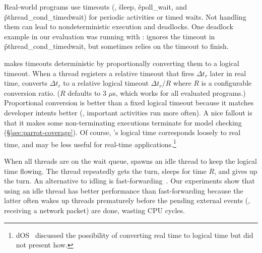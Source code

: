 Real-world programs use timeouts (\eg, \v{sleep},
\v{epoll\_wait}, and \v{pthread\_cond\_timedwait}) for periodic activities
or timed waits.  Not handling them can lead to nondeterministic execution and
deadlocks.  One deadlock example in our evaluation was running \pbzip with
\dthreads: \dthreads ignores the timeout in
\v{pthread\_cond\_timedwait}, but \pbzip sometimes relies on the timeout to finish.

\parrot makes timeouts deterministic by proportionally converting them to a
logical timeout.  When a thread registers a relative timeout that fires
$\Delta t_r$ later in real time, \parrot converts $\Delta t_r$ to a relative
logical timeout $\Delta t_r /R$ where $R$ is a configurable conversion
ratio. ($R$ defaults to 3 $\mu$s, which works for all evaluated programs.)
Proportional conversion is better than a fixed logical timeout because it
matches developer intents better (\eg, important activities
run more often).  A nice fallout is that it makes some
non-terminating executions terminate for model checking
(\S\ref{sec:parrot-coverage}).  Of course, \parrot's logical time corresponds
loosely to real time, and may be less useful for real-time applications.\footnote{
dOS~\cite{dos:osdi10} discussed the possibility of converting real time to
logical time but did not present how.}


When all threads are on the wait queue, \parrot spawns an idle thread to keep the
logical time flowing. The thread repeatedly gets the turn, sleeps for time
$R$, and gives up the turn.  An alternative to idling is
fast-forwarding~\cite{modist:nsdi09,dos:osdi10}.  Our experiments show
that using an idle thread has better performance than fast-forwarding
because the latter often wakes up threads prematurely before the pending
external events (\eg, receiving a network packet) are done, wasting CPU cycles.

